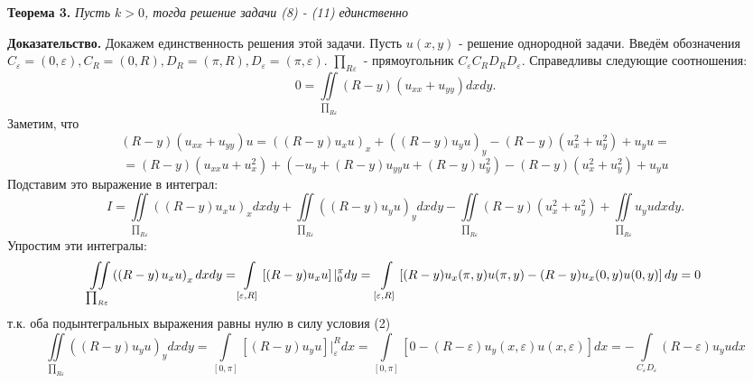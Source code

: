 \documentclass[9pt]{article}
\begin{document}
	\textbf{Теорема 3.} \textit{Пусть $k > 0$, тогда решение задачи (8) - (11) единственно}
	\par
	\textbf{Доказательство.} Докажем единственность решения этой задачи. Пусть $u(x,y)$ - решение однородной задачи.
	Введём обозначения $C_\varepsilon = (0, \varepsilon), C_R = (0, R), D_R = (\pi, R), D_\varepsilon = (\pi, \varepsilon)$. $\prod_{R\varepsilon}$ - прямоугольник $C_\varepsilon C_R D_R D_\varepsilon$. Справедливы следующие соотношения:
	\begin{equation*}
		0 = \iint\limits_{\prod_{R\varepsilon}} (R-y) (u_{xx} + u_{yy}) dx dy.
	\end{equation*}
	Заметим, что
	\begin{equation*}
		(R - y) (u_{xx} + u_{yy}) u = \left( \left(R - y\right) u_x u\right)_x  + \left( \left(R - y\right) u_y u\right)_y - \left(R- y\right) \left(u_x^2 + u_y^2\right) +  u_y u = 
	\end{equation*}
	\begin{equation*}
		= \left(R-y\right) \left(u_{xx} u + u_x^2\right) + \left(-u_y + \left(R-y\right) u_{yy} u + \left(R-y\right)u_y^2\right) - \left(R- y\right) \left(u_x^2 + u_y^2\right)+  u_y u
	\end{equation*}
	Подставим это выражение в интеграл:
	\begin{equation*}
		I	=	\iint\limits_{\prod_{R\varepsilon}} \left( \left(R - y\right) u_x u\right)_x dx dy  + \iint\limits_{\prod_{R\varepsilon}} \left( \left(R - y\right) u_y u\right)_y dx dy  
		- \iint\limits_{\prod_{R\varepsilon}} \left(R- y\right) \left(u_x^2 + u_y^2\right) + \iint\limits_{\prod_{R\varepsilon}} u_y u dx dy.
	\end{equation*}
	Упростим эти интегралы:
	\begin{equation*}
		\iint\limits_{\prod_{R\varepsilon}} \left( \left(R - y\right) u_x u\right)_x dx dy = \int\limits_{[\varepsilon, R]} \left[(R-y)u_xu\right] \vert_0^\pi dy = \\ \int\limits_{[\varepsilon, R]} \left[(R-y) u_x(\pi, y)u(\pi,y) - (R-y) u_x(0, y)u(0,y)\right]dy = 0
	\end{equation*} т.к. оба подынтегральных выражения равны нулю в силу условия (2)
	\begin{equation*}
		\iint\limits_{\prod_{R\varepsilon}} \left( \left(R - y\right) u_y u\right)_y dx dy = \int\limits_{[0,\pi]} \left[\left(R - y\right) u_y u\right] \vert_\varepsilon^R dx =
		\int\limits_{[0,\pi]} \left[0 - \left(R - \varepsilon \right) u_y(x, \varepsilon) u(x, \varepsilon) \right] dx =  - \int\limits_{C_\varepsilon D_\varepsilon} \left(R - \varepsilon \right) u_yu dx
	\end{equation*}
\end{document}
